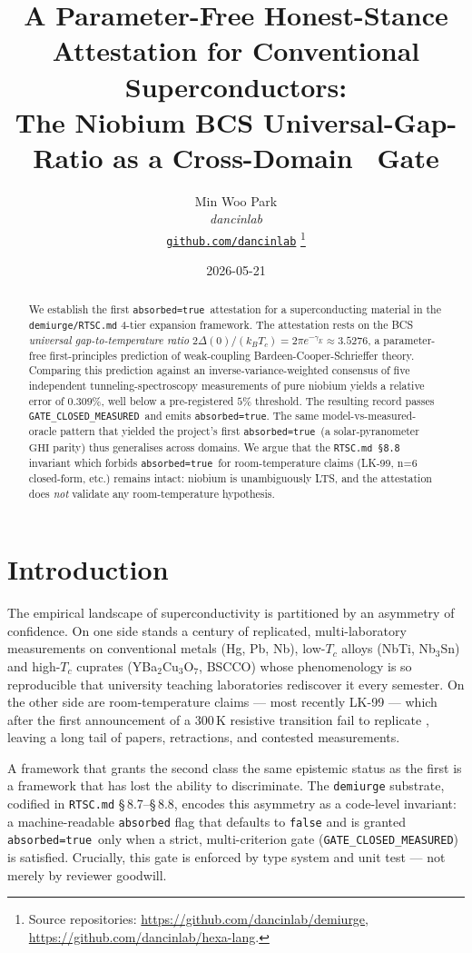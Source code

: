 \documentclass[11pt,a4paper]{article}
\title{
  \textbf{A Parameter-Free Honest-Stance Attestation for Conventional Superconductors:}\\[4pt]
  The Niobium BCS Universal-Gap-Ratio as a Cross-Domain \absorbedtrue\ Gate
}
\author{
  Min Woo Park\\
  \normalsize\textit{dancinlab}\\[2pt]
  \normalsize\href{https://github.com/dancinlab}{\texttt{github.com/dancinlab}}
  \thanks{Source repositories:
    \url{https://github.com/dancinlab/demiurge},
    \url{https://github.com/dancinlab/hexa-lang}.}
}
\date{2026-05-21}
\newcommand{\absorbedtrue}{\textcolor{honestgreen}{\texttt{absorbed=true}}}
\newcommand{\gateclosedmeas}{\texttt{GATE\_CLOSED\_MEASURED}}
\begin{document}
\maketitle

\begin{abstract}
We establish the first \absorbedtrue\ attestation for a superconducting
material in the \texttt{demiurge/RTSC.md} 4-tier expansion framework.
The attestation rests on the BCS \emph{universal gap-to-temperature ratio}
\(2\Delta(0)/(k_{B} T_{c}) = 2\pi e^{-\gamma_{E}} \approx 3.5276\),
a parameter-free first-principles prediction of weak-coupling Bardeen-Cooper-Schrieffer
theory. Comparing this prediction against an inverse-variance-weighted consensus
of five independent tunneling-spectroscopy measurements of pure niobium
yields a relative error of \(0.309\%\), well below a pre-registered
\(5\%\) threshold. The resulting record passes \gateclosedmeas\ and
emits \absorbedtrue.  The same model-vs-measured-oracle pattern that
yielded the project's first \absorbedtrue\ (a solar-pyranometer
\(\text{GHI}\) parity) thus generalises across domains. We argue that
the \texttt{RTSC.md \S 8.8} invariant which forbids \absorbedtrue\ for
room-temperature claims (LK-99, n=6 closed-form, etc.) remains intact:
niobium is unambiguously LTS, and the attestation does \emph{not} validate
any room-temperature hypothesis.
\end{abstract}

\section{Introduction}
\label{sec:intro}

The empirical landscape of superconductivity is partitioned by an
asymmetry of confidence. On one side stands a century of replicated,
multi-laboratory measurements on conventional metals (Hg, Pb, Nb), low-$T_c$
alloys (NbTi, Nb$_3$Sn) and high-$T_c$ cuprates (YBa$_2$Cu$_3$O$_7$, BSCCO)
whose phenomenology is so reproducible that university teaching laboratories
rediscover it every semester. On the other side are room-temperature
claims --- most recently LK-99 \cite{lee2023lk99,lee2023lk99companion} ---
which after the first announcement of a 300\,K resistive transition
fail to replicate \cite{nature2023replication}, leaving a long tail
of papers, retractions, and contested measurements.

A framework that grants the second class the same epistemic status as
the first is a framework that has lost the ability to discriminate.
The \texttt{demiurge} substrate, codified in \texttt{RTSC.md}
\S\,8.7--\S\,8.8, encodes this asymmetry as a code-level invariant: a
machine-readable \texttt{absorbed} flag that defaults to \texttt{false}
and is granted \absorbedtrue\ only when a strict, multi-criterion gate
(\gateclosedmeas) is satisfied. Crucially, this gate is enforced by
type system and unit test --- not merely by reviewer goodwill.
\end{document}

